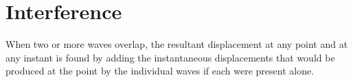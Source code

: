 \chapter{Interference}


    \par When two or more waves overlap, the resultant displacement at any point and
      at any instant is found by adding the instantaneous displacements that would be
      produced at the point by the individual waves if each were present alone.
